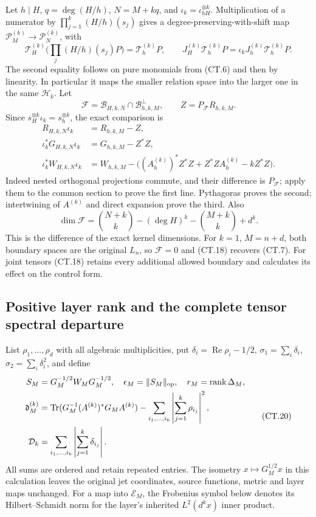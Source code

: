 Let \(h\mid H\), \(q=\deg(H/h)\),
\(N=M+kq\), and \(\iota_k=\iota_{hH}^{\otimes k}\).
Multiplication of a numerator by
\(\prod_{j=1}^k(H/h)(s_j)\) gives a degree-preserving-with-shift
map \(\mathcal P_M^{(k)}\to\mathcal P_N^{(k)}\), with
\[
 \mathcal T_H^{(k)}\bigl(\textstyle\prod_j(H/h)(s_j)P\bigr)
       =\mathcal T_h^{(k)}P,\qquad
 J_H^{(k)}\mathcal T_h^{(k)}P
       =\iota_kJ_h^{(k)}\mathcal T_h^{(k)}P.              \tag{CT.17}
\]
The second equality follows on pure monomials from (CT.6) and then
by linearity.  In particular it maps the smaller relation space
into the larger one in the same \(\mathcal H_k\).
Let
\[
 \mathcal F=\mathcal B_{H,k,N}\cap\mathcal B_{h,k,M}^{\perp},
 \qquad Z=P_{\mathcal F}R_{h,k,M}.
\]
Since \(s_H^{\otimes k}\iota_k=s_h^{\otimes k}\), the exact
comparison is
\[
 \begin{split}
 R_{H,k,N}\iota_k&=R_{h,k,M}-Z,\\
 \iota_k^*G_{H,k,N}\iota_k&=G_{h,k,M}-Z^*Z,\\
 \iota_k^*W_{H,k,N}\iota_k
   &=W_{h,k,M}-\bigl((A_h^{(k)})^*Z^*Z
                         +Z^*ZA_h^{(k)}-kZ^*Z\bigr).
 \end{split}                                                   \tag{CT.18}
\]
Indeed nested orthogonal projections commute, and their difference
is \(P_{\mathcal F}\); apply them to the common section to prove
the first line.  Pythagoras proves the second; intertwining of
\(A^{(k)}\) and direct expansion prove the third.  Also
\[
 \dim\mathcal F=
 \binom{N+k}{k}-(\deg H)^k-\binom{M+k}{k}+d^k.           \tag{CT.19}
\]
This is the difference of the exact kernel dimensions.  For
\(k=1\), \(M=n+d\), both boundary spaces are the original
\(L_n\), so \(\mathcal F=0\) and (CT.18) recovers (CT.7).
For joint tensors (CT.18) retains every additional allowed boundary
and calculates its effect on the control form.

\subsection{Positive layer rank and the complete tensor spectral departure}

List \(\rho_1,\ldots,\rho_d\) with all algebraic
multiplicities, put \(\delta_i=\operatorname{Re}\rho_i-1/2\),
\(\sigma_1=\sum_i\delta_i\), \(\sigma_2=\sum_i\delta_i^2\),
and define
\[
 \begin{split}
 S_M&=G_M^{-1/2}W_MG_M^{-1/2},\quad
       \epsilon_M=\|S_M\|_{\rm op},\quad
       r_M=\operatorname{rank}\Delta_M,\\
 \mathfrak d_M^{(k)}&=
 \operatorname{Tr}(G_M^{-1}(A^{(k)})^*G_MA^{(k)})
    -\sum_{i_1,\ldots,i_k}\left|\sum_{j=1}^k\rho_{i_j}\right|^2,\\
 \mathcal D_k&=\sum_{i_1,\ldots,i_k}
                          \left|\sum_{j=1}^k\delta_{i_j}\right|.
 \end{split}                                                   \tag{CT.20}
\]
All sums are ordered and retain repeated entries.  The isometry
\(x\mapsto G_M^{1/2}x\) in this calculation leaves the original
jet coordinates, source functions, metric and layer maps unchanged.
For a map into \(\mathcal E_M\), the Frobenius symbol below
denotes its Hilbert--Schmidt norm for the layer's inherited
\(L^2(d^kx)\) inner product.

